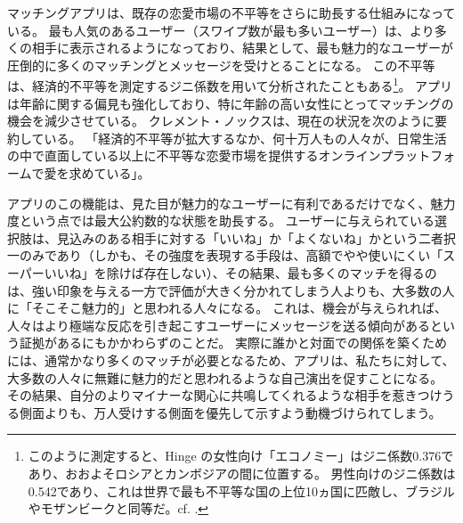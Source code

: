\documentclass[paper=a4,book,openany]{jlreq}
\begin{document}
マッチングアプリは、既存の恋愛市場の不平等をさらに助長する仕組みになっている。
最も人気のあるユーザー（スワイプ数が最も多いユーザー）は、より多くの相手に表示されるようになっており、結果として、最も魅力的なユーザーが圧倒的に多くのマッチングとメッセージを受けとることになる\citep{carr16:_i_foun_out}。
この不平等は、経済的不平等を測定するジニ係数を用いて分析されたこともある\footnote{このように測定すると、Hinge の女性向け「エコノミー」はジニ係数0.376であり、おおよそロシアとカンボジアの間に位置する。
男性向けのジニ係数は0.542であり、これは世界で最も不平等な国の上位10ヵ国に匹敵し、ブラジルやモザンビークと同等だ。cf. \citet{kopf17:_these_statis_show_why_its}.}。
アプリは年齢に関する偏見も強化しており、特に年齢の高い女性にとってマッチングの機会を減少させている\citep{schrobsdorff21:_paulin_poriz}。
クレメント・ノックスは、現在の状況を次のように要約している。
「経済的不平等が拡大するなか、何十万人もの人々が、日常生活の中で直面している以上に不平等な恋愛市場を提供するオンラインプラットフォームで愛を求めている」\citep[p. 408]{clement20:_seduc}。

アプリのこの機能は、見た目が魅力的なユーザーに有利であるだけでなく、魅力度という点では最大公約数的な状態を助長する。
ユーザーに与えられている選択肢は、見込みのある相手に対する「いいね」か「よくないね」かという二者択一のみであり（しかも、その強度を表現する手段は、高額でやや使いにくい「スーパーいいね」を除けば存在しない）、その結果、最も多くのマッチを得るのは、強い印象を与える一方で評価が大きく分かれてしまう人よりも、大多数の人に「そこそこ魅力的」と思われる人々になる。
これは、機会が与えられれば、人々はより極端な反応を引き起こすユーザーにメッセージを送る傾向があるという証拠があるにもかかわらずのことだ\citep{rudder11:_mathem_beaut}。
実際に誰かと対面での関係を築くためには、通常かなり多くのマッチが必要となるため、アプリは、私たちに対して、大多数の人々に無難に魅力的だと思われるような自己演出を促すことになる。
その結果、自分のよりマイナーな関心に共鳴してくれるような相手を惹きつけうる側面よりも、万人受けする側面を優先して示すよう動機づけられてしまう。
\end{document}
